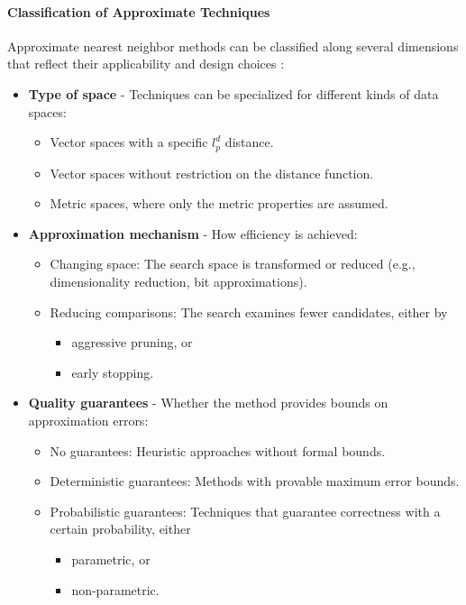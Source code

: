 \paragraph{Classification of Approximate Techniques}

Approximate nearest neighbor methods can be classified along several dimensions that reflect their applicability and design choices \cite{Patella-Ciaccia-2009}:

\begin{itemize}
    \item \textbf{Type of space} - Techniques can be specialized for different kinds of data spaces:
    \begin{itemize}
        \item Vector spaces with a specific $l_p^d$ distance.
        \item Vector spaces without restriction on the distance function.
        \item Metric spaces, where only the metric properties are assumed.
    \end{itemize}

    \item \textbf{Approximation mechanism} - How efficiency is achieved:
    \begin{itemize}
        \item Changing space: The search space is transformed or reduced (e.g., dimensionality reduction, bit approximations).
        \item Reducing comparisons: The search examines fewer candidates, either by
        \begin{itemize}
            \item aggressive pruning, or
            \item early stopping.
        \end{itemize}
    \end{itemize}

    \item \textbf{Quality guarantees} - Whether the method provides bounds on approximation errors:
    \begin{itemize}
        \item No guarantees: Heuristic approaches without formal bounds.
        \item Deterministic guarantees: Methods with provable maximum error bounds.
        \item Probabilistic guarantees: Techniques that guarantee correctness with a certain probability, either
        \begin{itemize}
            \item parametric, or
            \item non-parametric.
        \end{itemize}
    \end{itemize}


\end{itemize}
